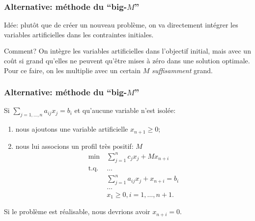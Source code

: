 \documentclass[usepdftitle=false]{beamer}
\begin{document}
\begin{frame}
\frametitle{Alternative: méthode du ``big-$M$''}

Idée: plutôt que de créer un nouveau problème, on va directement intégrer les variables artificielles dans les contraintes initiales.

\mbox{}

Comment? On intègre les variables artificielles dans l'objectif initial, mais avec un coût si grand qu'elles ne peuvent qu'être mises à zéro dans une solution optimale. Pour ce faire, on les multiplie avec un certain $M$ \textsl{suffisamment} grand.

\end{frame}

\begin{frame}
\frametitle{Alternative: méthode du ``big-$M$''}

Si $\sum_{j = 1,\ldots,n} a_{ij}x_j = b_i$ et qu'aucune variable n'est isolée:
\begin{enumerate}
\item
nous ajoutons une variable artificielle $x_{n+1} \geq 0$;
\item
nous lui associons un profil très positif: $M$
\begin{align*}
\min\ & \sum_{j = 1}^{n} c_{j}x_j + M x_{n+i} \\
\mbox{t.q. } & \ldots \\
& \sum_{j = 1}^n a_{ij}x_j + x_{n+i} = b_i \\
& \ldots \\
& x_1 \geq 0, i=1,\ldots,n+1.
\end{align*}
\end{enumerate}
Si le problème est réalisable, nous devrions avoir $x_{n+i} = 0$.

\end{frame}
\end{document}
